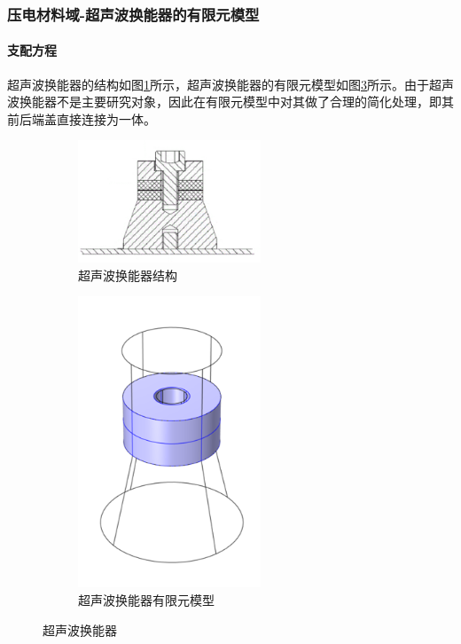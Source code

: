 \documentclass[fontset=windows,12pt,a4paper,titlepage,UTF8]{ctexart}
\begin{document}
\subsubsection{压电材料域-超声波换能器的有限元模型}

\paragraph{支配方程}

超声波换能器的结构如图\ref{pic:超声波换能器结构}所示，超声波换能器的有限元模型如图\ref{pic:超声波换能器有限元模型}所示。由于超声波换能器不是主要研究对象，因此在有限元模型中对其做了合理的简化处理，即其前后端盖直接连接为一体。

\begin{figure}[h]
  \centering
  \begin{subfigure}{0.4\textwidth}
    \centering
    \includegraphics[width=0.6\textwidth]{assets/ultrasonic_transducer_structure.png}
    \caption{超声波换能器结构}
    \label{pic:超声波换能器结构}
  \end{subfigure}
  \hfil
  \begin{subfigure}{0.4\textwidth}
    \centering
    \includegraphics[width=0.6\textwidth]{assets/ultrasonic_transducer_model.png}
    \caption{超声波换能器有限元模型}
    \label{pic:超声波换能器有限元模型}
  \end{subfigure}
  \caption{超声波换能器}
\end{figure}
\end{document}
